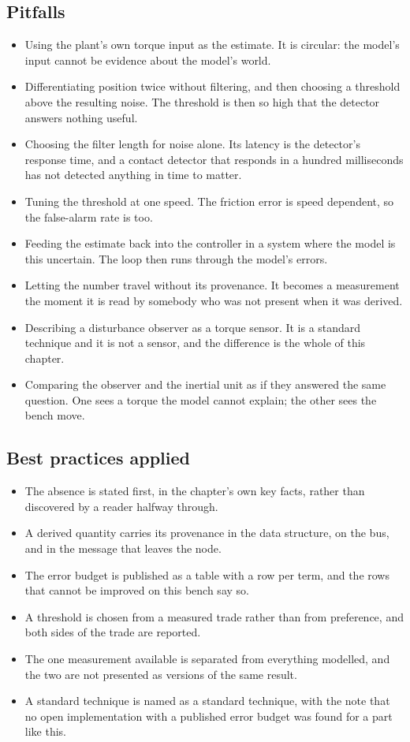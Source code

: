 \subsection*{Pitfalls}

\begin{itemize}
\item Using the plant's own torque input as the estimate. It is circular: the
model's input cannot be evidence about the model's world.
\item Differentiating position twice without filtering, and then choosing a
threshold above the resulting noise. The threshold is then so high that the
detector answers nothing useful.
\item Choosing the filter length for noise alone. Its latency is the detector's
response time, and a contact detector that responds in a hundred milliseconds
has not detected anything in time to matter.
\item Tuning the threshold at one speed. The friction error is speed dependent,
so the false-alarm rate is too.
\item Feeding the estimate back into the controller in a system where the model
is this uncertain. The loop then runs through the model's errors.
\item Letting the number travel without its provenance. It becomes a
measurement the moment it is read by somebody who was not present when it was
derived.
\item Describing a disturbance observer as a torque sensor. It is a standard
technique and it is not a sensor, and the difference is the whole of this
chapter.
\item Comparing the observer and the inertial unit as if they answered the same
question. One sees a torque the model cannot explain; the other sees the bench
move.
\end{itemize}

\subsection*{Best practices applied}

\begin{itemize}
\item The absence is stated first, in the chapter's own key facts, rather than
discovered by a reader halfway through.
\item A derived quantity carries its provenance in the data structure, on the
bus, and in the message that leaves the node.
\item The error budget is published as a table with a row per term, and the
rows that cannot be improved on this bench say so.
\item A threshold is chosen from a measured trade rather than from preference,
and both sides of the trade are reported.
\item The one measurement available is separated from everything modelled, and
the two are not presented as versions of the same result.
\item A standard technique is named as a standard technique, with the note that
no open implementation with a published error budget was found for a part like
this.
\end{itemize}

